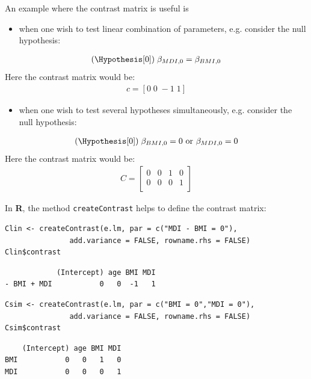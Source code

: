 \documentclass{article}
\newcommand\Rlogo{\textbf{\textsf{R}}}
\begin{document}
An example where the contrast matrix is useful is
\begin{itemize}
\item when one wish to test linear combination of parameters,
e.g. consider the null hypothesis:
\end{itemize}
\begin{align*}
(\Hypothesis[0]) \; \beta_{MDI,0} = \beta_{BMI,0}
\end{align*}
Here the contrast matrix would be:
\begin{align*}
c=[0 \; 0 \; -1 \; 1]
\end{align*}
\begin{itemize}
\item when one wish to test several hypotheses simultaneously,
e.g. consider the null hypothesis:
\end{itemize}
\begin{align*}
(\Hypothesis[0]) \; \beta_{BMI,0} = 0 \text{ or } \beta_{MDI,0} = 0 \\
\end{align*}
Here the contrast matrix would be:
\begin{align*}
C = \begin{bmatrix}
0 & 0 & 1 & 0 \\
0 & 0 & 0 & 1 \\
\end{bmatrix}
\end{align*}

In \Rlogo{}, the method \texttt{createContrast} helps to define the contrast
matrix:
\lstset{language=r,label= ,caption= ,captionpos=b,numbers=none}
\begin{lstlisting}
Clin <- createContrast(e.lm, par = c("MDI - BMI = 0"),
		       add.variance = FALSE, rowname.rhs = FALSE)
Clin$contrast
\end{lstlisting}

\begin{verbatim}
            (Intercept) age BMI MDI
- BMI + MDI           0   0  -1   1
\end{verbatim}

\lstset{language=r,label= ,caption= ,captionpos=b,numbers=none}
\begin{lstlisting}
Csim <- createContrast(e.lm, par = c("BMI = 0","MDI = 0"),
		       add.variance = FALSE, rowname.rhs = FALSE)
Csim$contrast
\end{lstlisting}

\begin{verbatim}
    (Intercept) age BMI MDI
BMI           0   0   1   0
MDI           0   0   0   1
\end{verbatim}
\end{document}
